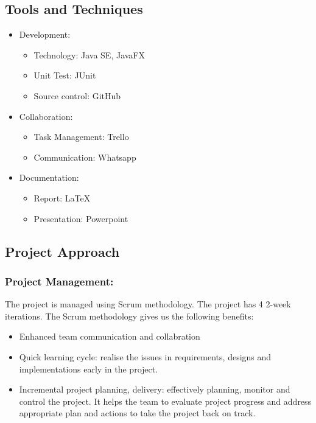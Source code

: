 \documentclass[11pt]{article}
\begin{document}
	
\subsection{Tools and Techniques}
\begin{itemize}


\item Development:
	\begin{itemize}[noitemsep]
	\item Technology: Java SE, JavaFX
	\item Unit Test: JUnit
	\item Source control: GitHub
	\end{itemize}
\item 	Collaboration:
	\begin{itemize}[noitemsep]
	\item Task Management: Trello
	\item Communication: Whatsapp
	\end{itemize}
\item  	Documentation:
	\begin{itemize}[noitemsep]
	\item Report: LaTeX
	\item Presentation: Powerpoint
	\end{itemize}
\end{itemize}
\subsection{Project Approach} 
    \subsubsection{Project Management: } The project is managed using Scrum methodology. 
    The project has 4  2-week iterations.
    The Scrum methodology gives us the following benefits:
    \begin{itemize}
    
    \item Enhanced team communication and collabration
    \item Quick learning cycle: realise the issues in requirements, designs and implementations early in the project. 
    \item Incremental project planning, delivery: effectively planning, monitor and control the project. It helps the team to evaluate project progress and address appropriate plan and actions to take the project back on track.
    \end{itemize}
    
\end{document}

